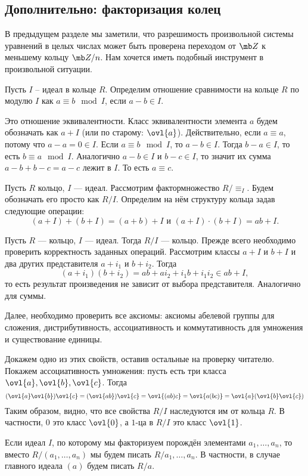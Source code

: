 \subsection{Дополнительно: факторизация колец}


В предыдущем разделе мы заметили, что разрешимость произвольной системы уравнений в целых числах может быть проверена переходом от $\mb Z$ к меньшему кольцу $\mb Z/n$. Нам хочется иметь подобный инструмент в произвольной ситуации.

\dfn Пусть $I$ -- идеал в кольце $R$. Определим отношение сравнимости на кольце $R$ по модулю $I$ как $a\equiv b \mod I$, если $a-b \in I$.
\edfn

\utv Это отношение эквивалентности. Класс эквивалентности элемента $a$ будем обозначать как $a+I$ (или по старому: $\ovl{a}$).
\proof Действительно, если $a\equiv a$, потому что $a-a =0 \in I$. Если $a\equiv b \mod I$, то $a-b \in I$. Тогда $b-a \in I$, то есть $b\equiv a \mod I$. Аналогично $a-b \in I$ и $b-c \in I$, то значит их сумма $a-b+b-c=a-c$ лежит в $I$. То есть $a\equiv c$.
\endproof
\eutv

\dfn Пусть $R$ кольцо, $I$ --- идеал. Рассмотрим фактормножество $R/\equiv_I$. Будем обозначать его просто как $R/I$. Определим на нём структуру кольца задав следующие операции:\\
$$(a+I)+ (b+I) = (a+b)+I \text{ и } (a+I)\cdot (b+I)=ab+I. $$
\edfn

 Пусть $R$ --- кольцо, $I$ --- идеал. Тогда $R/I$ --- кольцо.
\elm
\proof
Прежде всего необходимо проверить корректность заданных операций. Рассмотрим классы $a+I$ и $b+I$ и два других представителя $a+i_1$ и $b+i_2$. Тогда $$(a+i_1)(b+i_2)=ab +ai_2+i_1b+ i_1i_2 \in ab+I,$$
то есть результат произведения не зависит от выбора представителя. Аналогично для суммы.

Далее, необходимо проверить все аксиомы: аксиомы абелевой группы для сложения, дистрибутивность, ассоциативность  и коммутативность для умножения и существование единицы.

Докажем одно из этих свойств, оставив остальные на проверку читателю. Покажем ассоциативность умножения: пусть есть три класса $\ovl{a},\ovl{b},\ovl{c}$. Тогда
$$(\ovl{a}\ovl{b})\ovl{c}=(\ovl{ab})\ovl{c}=\ovl{(ab)c}=\ovl{a(bc)}=\ovl{a}(\ovl{b}\ovl{c})$$
Таким образом, видно, что все свойства $R/I$ наследуются им от кольца $R$. В частности, $0$ это класс $\ovl{0}$, а $1$-ца в $R/I$ это класс $\ovl{1}$.
\endproof

Если идеал $I$, по которому мы факторизуем порождён элементами $a_1,\dots,a_n$, то вместо $R/(a_1,\dots,a_n)$ мы будем писать $R/a_1,\dots,a_n$. В частности, в случае главного идеала $(a)$ будем писать $R/a$.

